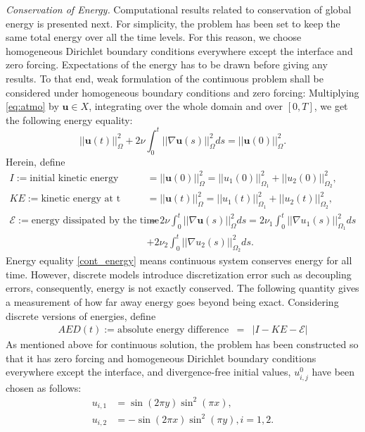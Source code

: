 \documentclass[10pt]{article}%
\numberwithin{equation}{section}
\begin{document}
{\it Conservation of Energy.} Computational results related to conservation of global energy is presented next. For simplicity, the problem has been set to keep the same total energy over all the time levels. For this reason, we choose homogeneous Dirichlet boundary conditions everywhere except the interface and zero forcing. Expectations of the energy has to be drawn before giving any results. To that end, weak formulation of the continuous problem shall be considered under homogeneous boundary conditions and zero forcing: Multiplying \eqref{eq:atmo} by $\textbf{u} \in X$, integrating over the whole domain and over $[0,T]$, we get the following energy equality:
\begin{equation}\label{cont_energy}
||\textbf{u}(t)||_{\Omega}^2 + 2\nu\int_{0}^t||\nabla \textbf{u}(s)||_{\Omega}^2ds =  ||\textbf{u}(0)||_{\Omega}^2.
\end{equation}
Herein, define
\begin{equation}\nonumber
\begin{split}
I:=\text{initial kinetic energy } &= ||\textbf{u}(0)||_{\Omega}^2 = ||u_1(0)||_{\Omega_1}^2 + ||u_2(0)||_{\Omega_2}^2,\\
KE:=\text{kinetic energy at t } &= ||\textbf{u}(t)||_{\Omega}^2 = ||u_1(t)||_{\Omega_1}^2 + ||u_2(t)||_{\Omega_2}^2,\\
\mathcal{E}:=\text{energy dissipated by the time t } &= 2\nu\int_{0}^t||\nabla \textbf{u}(s)||_{\Omega}^2ds = 2\nu_1 \int_{0}^t||\nabla u_1(s)||_{\Omega_1}^2ds
\\
&+ 2\nu_2 \int_{0}^t||\nabla u_2(s)||_{\Omega_2}^2ds.
\end{split}
\end{equation}
Energy equality \eqref{cont_energy} means continuous system conserves energy for all time. However, discrete models introduce discretization error such as decoupling errors, consequently, energy is not exactly conserved. The following quantity gives a measurement of how far away energy goes beyond being exact. Considering discrete versions of energies, define
\begin{eqnarray}
AED(t):=\text{absolute energy difference} &=& |I-KE-\mathcal{E}|
\end{eqnarray}
As mentioned above for continuous solution, the problem has been constructed so that it has zero forcing and homogeneous Dirichlet boundary conditions everywhere except the interface, and divergence-free initial values, $u_{i,j}^0$ have been chosen as follows:
\begin{equation}\label{IC}
\begin{split}
u_{i,1} &= \sin(2\pi y)\sin^2(\pi x),\\
u_{i,2} &=-\sin(2\pi x)\sin^2(\pi y), i=1,2.
\end{split}
\end{equation}
\end{document}
